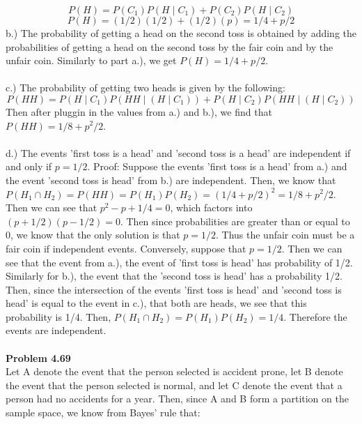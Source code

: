 \documentclass{article}
\begin{document}
$$ P(H) = P(C_{1})P(H\mid\!C_{1}) + P(C_{2})P(H\mid\!C_{2}) $$
$$ P(H) = (1/2)(1/2) + (1/2)(p) = 1/4 + p/2$$
b.) The probability of getting a head on the second toss is obtained by adding the probabilities of getting a head on the second toss by the fair coin and by the unfair coin. Similarly to part a.), we get $P(H)=1/4 + p/2$.
\\\\
c.) The probability of getting two heads is given by the following:
$$P(HH)=P(H\mid\!C_{1})P(HH\mid\!(H\mid\!C_{1}))+P(H\mid\!C_{2})P(HH\mid\!(H\mid\!C_{2}))$$
Then after pluggin in the values from a.) and b.), we find that $P(HH)=1/8 + p^2/2$.
\\\\
d.) The events 'first toss is a head' and 'second toss is a head' are independent if and only if $p = 1/2$.
Proof: Suppose the events 'first toss is a head' from a.) and the event 'second toss is head' from b.) are independent. Then, we know that $P(H_{1}\cap H_{2}) = P(HH) = P(H_{1})P(H_{2}) = (1/4 + p/2)^2 = 1/8 + p^2/2$. Then we can see that $p^2-p+1/4 = 0$, which factors into $(p+1/2)(p-1/2)=0$. Then since probabilities are greater than or equal to 0, we know that the only solution is that $p=1/2$. Thus the unfair coin must be a fair coin if independent events. 
Conversely, suppose that $p=1/2$. Then we can see that the event from a.), the event of 'first toss is head' has probability of 1/2. Similarly for b.), the event that the 'second toss is head' has a probability 1/2. Then, since the intersection of the events 'first toss is head' and 'second toss is head' is equal to the event in c.), that both are heads, we see that this probability is 1/4. Then, $P(H_{1} \cap H_{2}) = P(H_{1})P(H_{2}) = 1/4$. Therefore the events are independent.
\\\\
\noindent\textbf{Problem 4.69}\\
Let A denote the event that the person selected is accident prone, let B denote the event that the person selected is normal, and let C denote the event that a person had no accidents for a year. Then, since A and B form a partition on the sample space, we know from Bayes' rule that:
\end{document}
